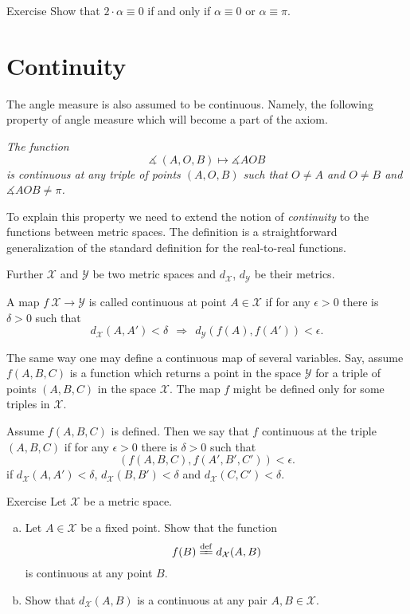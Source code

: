 \begin{thm}{Exercise}\label{ex:2a=0}
Show that $2\cdot\alpha\equiv0$ if and only if $\alpha\equiv0$ or $\alpha\equiv\pi$.
\end{thm}

\section*{Continuity}

The angle measure is also assumed to be continuous.
Namely, the following property of angle measure which will become a part of the axiom.

\textit{The function}
$$\measuredangle\:(A,O,B)\mapsto\measuredangle A O B$$
\textit{is continuous at any triple of points $(A,O,B)$
such that $O\ne A$ and $O\ne B$ and $\measuredangle A O B\ne\pi$.}

To explain this property we need to extend the notion of {}\emph{continuity} to the functions between metric spaces.
The definition is a straightforward generalization of the standard definition for the real-to-real functions.

Further $\mathcal X$ and $\mathcal Y$ be two metric spaces 
and $d_{\mathcal X}$, $d_{\mathcal Y}$ be their metrics.

A map $f\:\mathcal X\to\mathcal Y$ is called continuous at point $A\in \mathcal X$
if for any  $\epsilon>0$ there is $\delta>0$ such that 
\[d_{\mathcal X}(A,A')<\delta\ \ \Rightarrow\ \ d_{\mathcal Y}(f(A),f(A'))<\epsilon.\]

The same way one may define a continuous map of several variables.
Say, assume $f(A,B,C)$ is a function which returns a point in the space $\mathcal Y$ for a triple of points $(A,B,C)$
in the space $\mathcal X$.
The map $f$ might be defined only for some triples in $\mathcal X$.

Assume $f(A,B,C)$ is defined.
Then we say that $f$ continuous at the triple $(A,B,C)$ 
if for any $\epsilon>0$ there is $\delta>0$ such that 
\[(f(A,B,C),f(A',B',C'))<\epsilon.\]
if $d_{\mathcal X}(A,A')<\delta$, $d_{\mathcal X}(B,B')<\delta$ and $d_{\mathcal X}(C,C')<\delta$.


\begin{thm}{Exercise}\label{ex:dist-cont}
Let $\mathcal{X}$ be a metric space.
\begin{enumerate}[(a)]
\item\label{ex:dist-cont:a} Let $A\in \mathcal{X}$ be a fixed point.
Show that the function 
$$f(B)\df
d_{\mathcal{X}}(A,B)$$ 
is continuous at any point $B$.
\item Show that $d_{\mathcal{X}}(A,B)$ is a continuous  at any pair $A,B\in \mathcal{X}$.
\end{enumerate}

\end{thm}


